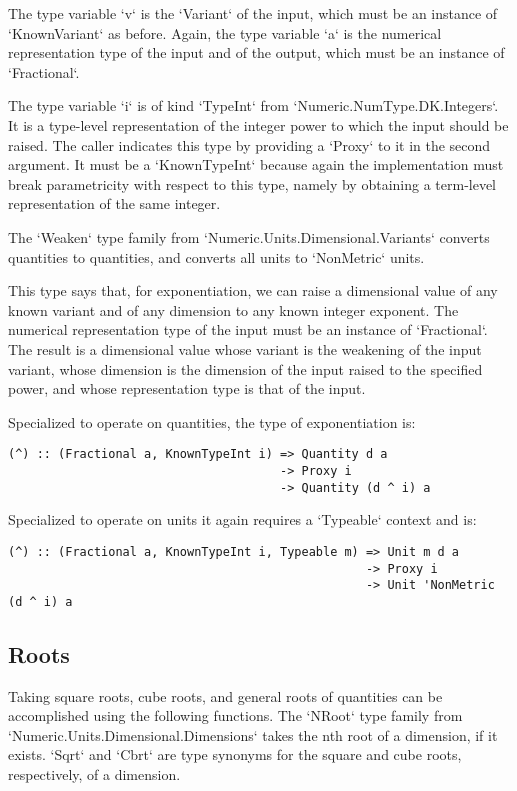 \documentclass[11pt]{report}
\begin{document}
The type variable `v` is the `Variant` of the input, which must be an instance of `KnownVariant` as before. Again, the type variable `a` is
the numerical representation type of the input and of the output, which must be an instance of `Fractional`.

The type variable `i` is of kind `TypeInt` from `Numeric.NumType.DK.Integers`. It is a type-level representation of the integer power to which
the input should be raised. The caller indicates this type by providing a `Proxy` to it in the second argument. It must be a `KnownTypeInt` because
again the implementation must break parametricity with respect to this type, namely by obtaining a term-level representation of the same integer.

The `Weaken` type family from `Numeric.Units.Dimensional.Variants` converts quantities to quantities, and converts all units to `NonMetric` units.

This type says that, for exponentiation, we can raise a dimensional value of any known variant and of any dimension to any known integer exponent.
The numerical representation type of the input must be an instance of `Fractional`. The result is a dimensional value whose variant is the weakening
of the input variant, whose dimension is the dimension of the input raised to the specified power, and whose representation type is that of the input.

Specialized to operate on quantities, the type of exponentiation is:

\begin{lstlisting}
(^) :: (Fractional a, KnownTypeInt i) => Quantity d a
                                      -> Proxy i
                                      -> Quantity (d ^ i) a
\end{lstlisting}

Specialized to operate on units it again requires a `Typeable` context and is:

\begin{lstlisting}
(^) :: (Fractional a, KnownTypeInt i, Typeable m) => Unit m d a
                                                  -> Proxy i
                                                  -> Unit 'NonMetric (d ^ i) a
\end{lstlisting}

\subsection{Roots}

Taking square roots, cube roots, and general roots of quantities can be accomplished using the following functions.
The `NRoot` type family from `Numeric.Units.Dimensional.Dimensions` takes the nth root of a dimension, if it exists.
`Sqrt` and `Cbrt` are type synonyms for the square and cube roots, respectively, of a dimension.
\end{document}
